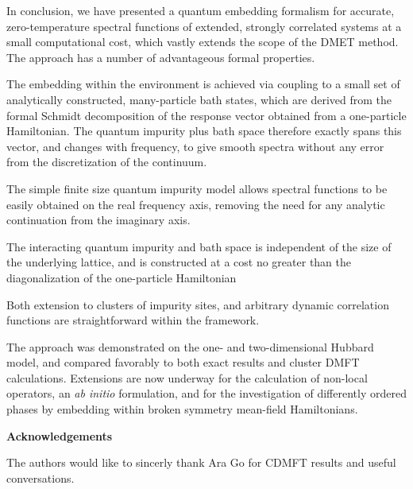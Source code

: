 \documentclass[aps,twocolumn,nobibnotes]{revtex4}
\begin{document}
In conclusion, we have presented a quantum embedding formalism for accurate, zero-temperature spectral functions of extended, strongly correlated systems 
at a small computational cost, which vastly 
extends the scope of the DMET method. The approach has a number of 
advantageous formal properties. 
\begin{inparaenum}
\item The embedding within the environment is achieved via coupling to a small set of analytically constructed, many-particle bath states,
    which are derived from the formal Schmidt decomposition of the response vector obtained from a one-particle Hamiltonian. The quantum impurity
    plus bath space therefore exactly spans this vector, and
    changes with frequency, to give smooth spectra without any error from the discretization of the continuum.
\item The simple finite size quantum impurity model allows spectral functions to be easily obtained on the real frequency axis, removing the 
    need for any analytic continuation from the imaginary axis.
\item The interacting quantum impurity and bath space is independent of the size of the underlying lattice, and is constructed at a cost no greater than the
    diagonalization of the one-particle Hamiltonian
\item Both extension to clusters of impurity sites, and arbitrary dynamic correlation functions are straightforward within the framework.
\end{inparaenum}
The approach was demonstrated on the one- and two-dimensional Hubbard model, and compared favorably to both exact results and cluster DMFT calculations. Extensions are now underway for the
calculation of non-local operators, an {\em ab initio} formulation, and for the investigation of differently ordered phases by embedding within broken symmetry mean-field Hamiltonians.

{\bf Acknowledgements}

The authors would like to sincerly thank Ara Go for CDMFT results and useful conversations.


\end{document}
